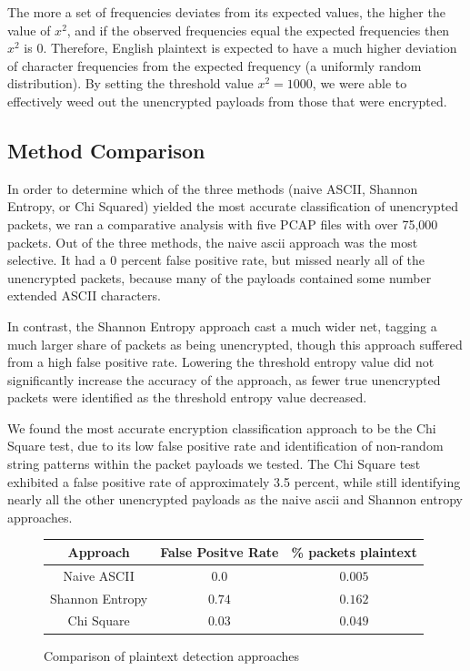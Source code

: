 The more a set of frequencies deviates from its expected values, the higher the value of $x^2$, and if the observed frequencies equal the expected frequencies then $x^2$ is 0. Therefore, English plaintext is expected to have a much higher deviation of character frequencies from the expected frequency (a uniformly random distribution). By setting the threshold value $x^2 = 1000$, we were able to effectively weed out the unencrypted payloads from those that were encrypted. 

\subsection{Method Comparison}
In order to determine which of the three methods (naive ASCII, Shannon Entropy, or Chi Squared) yielded the most accurate classification of unencrypted packets, we ran a comparative analysis with five PCAP files with over 75,000 packets. Out of the three methods, the naive ascii approach was the most selective. It had a 0 percent false positive rate, but missed nearly all of the unencrypted packets, because many of the payloads contained some number extended ASCII characters. 

In contrast, the Shannon Entropy approach cast a much wider net, tagging a much larger share of packets as being unencrypted, though this approach suffered from a high false positive rate. Lowering the threshold entropy value did not significantly increase the accuracy of the approach, as fewer true unencrypted packets were identified as the threshold entropy value decreased. 

We found the most accurate encryption classification approach to be the Chi Square test, due to its low false positive rate and identification of non-random string patterns within the packet payloads we tested. The Chi Square test exhibited a false positive rate of approximately 3.5 percent, while still identifying nearly all the other unencrypted payloads as the naive ascii and Shannon entropy approaches.


\begin{figure}
  \caption{Comparison of plaintext detection approaches}
  \begin{center}
    \begin{tabular}{||c c c||} 
    \hline
    Approach & False Positve Rate & \% packets plaintext\\ [0.5ex] 
    \hline\hline
    Naive ASCII & $0.0$ & $0.005$ \\ 
    \hline
    Shannon Entropy &  $0.74$ & $0.162$ \\
    \hline
    Chi Square & $0.03$ & $0.049$ \\
    \hline
    \end{tabular}
  \end{center}
\end{figure}

